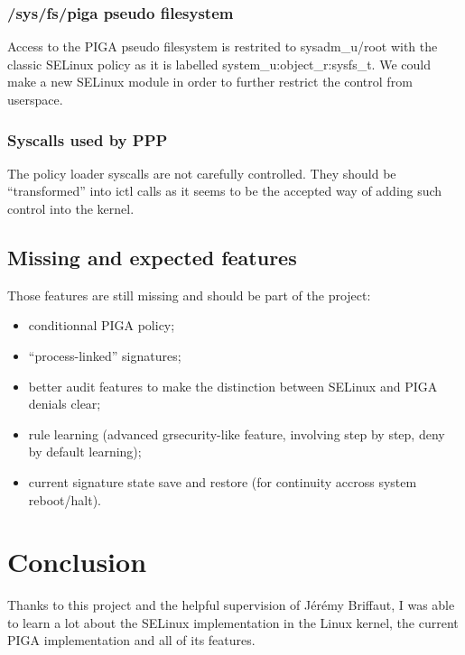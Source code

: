 \documentclass[pdftex,a4paper,titlepage,11pt]{article}
\begin{document}
\subsubsection{/sys/fs/piga pseudo filesystem}

Access to the PIGA pseudo filesystem is restrited to sysadm\_u/root with the
classic SELinux policy as it is labelled system\_u:object\_r:sysfs\_t. We could
make a new SELinux module in order to further restrict the control from
userspace.

\subsubsection{Syscalls used by PPP}

The policy loader syscalls are not carefully controlled. They should be
``transformed'' into ictl calls as it seems to be the accepted way of adding
such control into the kernel.

\subsection{Missing and expected features}

Those features are still missing and should be part of the project:

\begin{itemize}
	\item conditionnal PIGA policy;
	\item ``process-linked'' signatures;
	\item better audit features to make the distinction between SELinux and PIGA
denials clear;
	\item rule learning (advanced grsecurity-like feature, involving step by
step, deny by default learning);
	\item current signature state save and restore (for continuity accross
system reboot/halt).
\end{itemize}

\newpage

\section*{Conclusion} 

Thanks to this project and the helpful supervision of Jérémy Briffaut, I was
able to learn a lot about the SELinux implementation in the Linux kernel, the
current PIGA implementation and all of its features.
\end{document}
